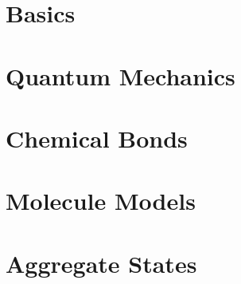\documentclass{cheatsheet}
\begin{document}
\section{Basics}
    
    
    
\section{Quantum Mechanics}
    
    
\section{Chemical Bonds}
    
    
    
    
    
\section{Molecule Models}
    
\section{Aggregate States}
    
    
    
    
\end{document}
